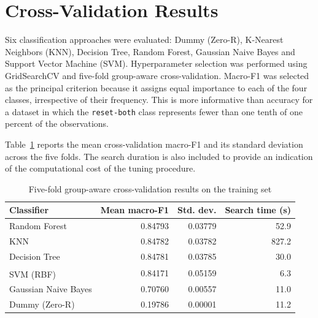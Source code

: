 \section{Cross-Validation Results}\label{sec:cross-validation-results}

Six classification approaches were evaluated: Dummy (Zero-R), K-Nearest Neighbors (KNN), Decision Tree, Random Forest, Gaussian Naive Bayes and Support Vector Machine (SVM). Hyperparameter selection was performed using GridSearchCV and five-fold group-aware cross-validation. Macro-F1 was selected as the principal criterion because it assigns equal importance to each of the four classes, irrespective of their frequency. This is more informative than accuracy for a dataset in which the \texttt{reset-both} class represents fewer than one tenth of one percent of the observations.

Table~\ref{tab:cv-results} reports the mean cross-validation macro-F1 and its standard deviation across the five folds. The search duration is also included to provide an indication of the computational cost of the tuning procedure.

\begin{table}[htbp]
  \centering
  \caption{Five-fold group-aware cross-validation results on the training set}
  \label{tab:cv-results}
  \small
  \begin{tabular}{|l|r|r|r|}
    \hline
    \textbf{Classifier} & \textbf{Mean macro-F1} & \textbf{Std. dev.} & \textbf{Search time (s)} \\
    \hline
    Random Forest & 0.84793 & 0.03779 & 52.9 \\
    KNN & 0.84782 & 0.03782 & 827.2 \\
    Decision Tree & 0.84781 & 0.03785 & 30.0 \\
    SVM (RBF)  \textsuperscript{} & 0.84171 & 0.05159 & 6.3 \\
    Gaussian Naive Bayes & 0.70760 & 0.00557 & 11.0 \\
    Dummy (Zero-R) & 0.19786 & 0.00001 & 11.2 \\
    \hline
  \end{tabular}
\end{table}

